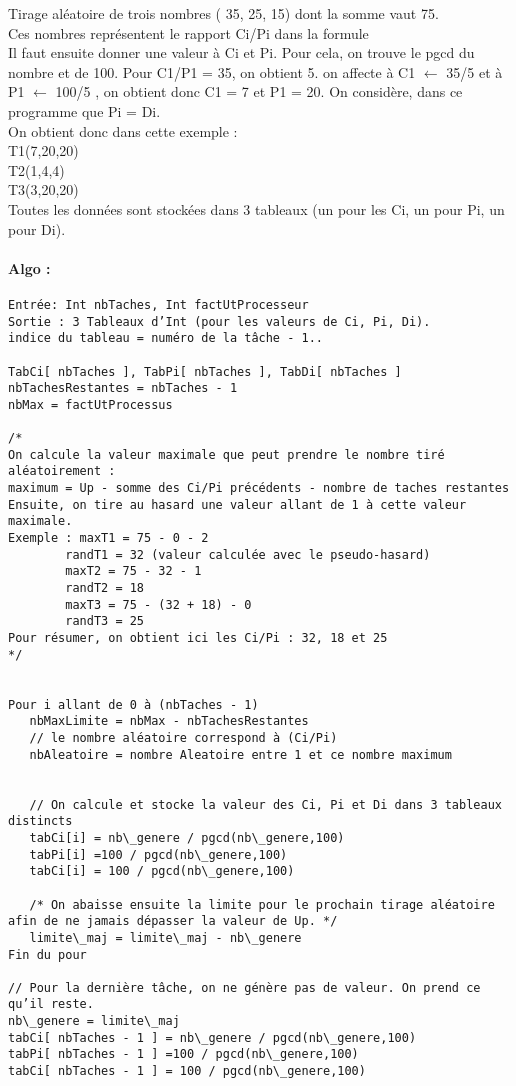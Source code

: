        Tirage aléatoire de trois nombres ( 35, 25, 15) dont la somme vaut 75. \\
        Ces nombres représentent le rapport Ci/Pi dans la formule  \\
        Il faut ensuite donner une valeur à Ci et Pi. Pour cela, on trouve le pgcd du nombre et de 100. Pour C1/P1 = 35, on obtient 5.  on affecte à C1 $\leftarrow$ 35/5 et à P1 $\leftarrow$ 100/5 , on obtient donc C1 = 7 et P1 = 20. On considère, dans ce programme que Pi = Di. \\
        
        On obtient donc dans cette exemple :  \\
        T1(7,20,20) \\
        T2(1,4,4) \\
        T3(3,20,20) \\

        Toutes les données sont stockées dans 3 tableaux (un pour les Ci, un pour Pi, un pour Di). 

\paragraph{Algo :}
\begin{verbatim}
Entrée: Int nbTaches, Int factUtProcesseur
Sortie : 3 Tableaux d’Int (pour les valeurs de Ci, Pi, Di). 
indice du tableau = numéro de la tâche - 1..

TabCi[ nbTaches ], TabPi[ nbTaches ], TabDi[ nbTaches ]
nbTachesRestantes = nbTaches - 1
nbMax = factUtProcessus 

/*
On calcule la valeur maximale que peut prendre le nombre tiré aléatoirement :
maximum = Up - somme des Ci/Pi précédents - nombre de taches restantes
Ensuite, on tire au hasard une valeur allant de 1 à cette valeur maximale.
Exemple : maxT1 = 75 - 0 - 2
        randT1 = 32 (valeur calculée avec le pseudo-hasard)
        maxT2 = 75 - 32 - 1
        randT2 = 18
        maxT3 = 75 - (32 + 18) - 0
        randT3 = 25
Pour résumer, on obtient ici les Ci/Pi : 32, 18 et 25
*/


Pour i allant de 0 à (nbTaches - 1)
   nbMaxLimite = nbMax - nbTachesRestantes
   // le nombre aléatoire correspond à (Ci/Pi)
   nbAleatoire = nombre Aleatoire entre 1 et ce nombre maximum


   // On calcule et stocke la valeur des Ci, Pi et Di dans 3 tableaux distincts
   tabCi[i] = nb\_genere / pgcd(nb\_genere,100)
   tabPi[i] =100 / pgcd(nb\_genere,100)
   tabCi[i] = 100 / pgcd(nb\_genere,100)
            
   /* On abaisse ensuite la limite pour le prochain tirage aléatoire afin de ne jamais dépasser la valeur de Up. */
   limite\_maj = limite\_maj - nb\_genere
Fin du pour

// Pour la dernière tâche, on ne génère pas de valeur. On prend ce qu’il reste.
nb\_genere = limite\_maj
tabCi[ nbTaches - 1 ] = nb\_genere / pgcd(nb\_genere,100)
tabPi[ nbTaches - 1 ] =100 / pgcd(nb\_genere,100)
tabCi[ nbTaches - 1 ] = 100 / pgcd(nb\_genere,100)
\end{verbatim}

